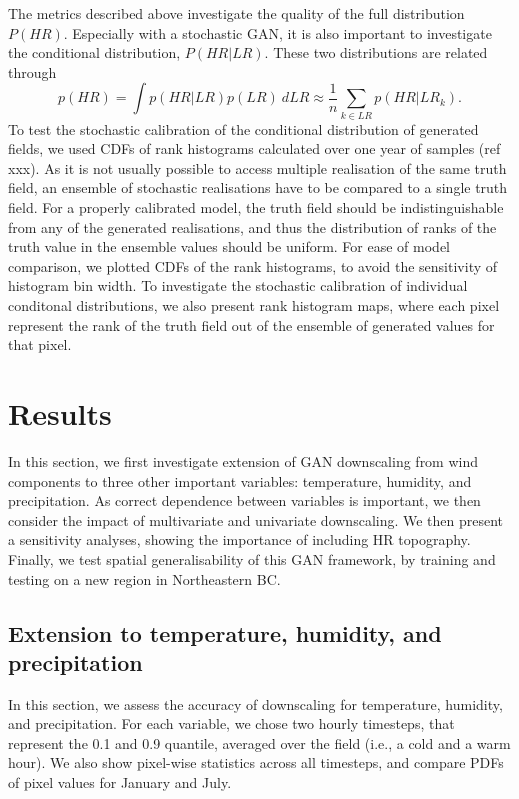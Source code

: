 \documentclass{ametsocV6.1}
\begin{document}
The metrics described above investigate the quality of the full distribution $P(HR)$. Especially with a stochastic GAN, it is also important to investigate the conditional distribution, $P(HR|LR)$. These two distributions are related through 
\begin{equation}
    p(HR) = \int p(HR | LR) p(LR) ~ dLR \approx \frac{1}{n}\sum_{k \in LR} p(HR | LR_k).
\end{equation} To test the stochastic calibration of the conditional distribution of generated fields, we used CDFs of rank histograms calculated over one year of samples (ref xxx). As it is not usually possible to access multiple realisation of the same truth field, an ensemble of stochastic realisations have to be compared to a single truth field. For a properly calibrated model, the truth field should be indistinguishable from any of the generated realisations, and thus the distribution of ranks of the truth value in the ensemble values should be uniform. For ease of model comparison, we plotted CDFs of the rank histograms, to avoid the sensitivity of histogram bin width. To investigate the stochastic calibration of individual conditonal distributions, we also present rank histogram maps, where each pixel represent the rank of the truth field out of the ensemble of generated values for that pixel. 

\section{Results}
In this section, we first investigate extension of GAN downscaling from wind components to three other important variables: temperature, humidity, and precipitation. As correct dependence between variables is important, we then consider the impact of multivariate and univariate downscaling. We then present a sensitivity analyses, showing the importance of including HR topography. Finally, we test spatial generalisability of this GAN framework, by training and testing on a new region in Northeastern BC. 

\subsection{Extension to temperature, humidity, and precipitation}
In this section, we assess the accuracy of downscaling for temperature, humidity, and precipitation. For each variable, we chose two hourly timesteps, that represent the 0.1 and 0.9 quantile, averaged over the field (i.e., a cold and a warm hour). We also show pixel-wise statistics across all timesteps, and compare PDFs of pixel values for January and July. 
\end{document}

